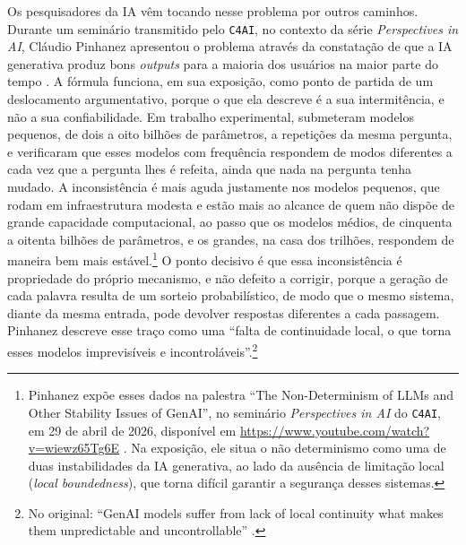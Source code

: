 Os pesquisadores da IA vêm tocando nesse problema por outros caminhos. Durante um seminário transmitido pelo \texttt{C4AI}, no contexto da série \textit{Perspectives in AI}, Cláudio Pinhanez apresentou o problema através da constatação de que a IA generativa produz bons \emph{outputs} para a maioria dos usuários na maior parte do tempo \parencite{Pinhanez2026Seminar}. A fórmula funciona, em sua exposição, como ponto de partida de um deslocamento argumentativo, porque o que ela descreve é a sua intermitência, e não a sua confiabilidade. Em trabalho experimental, \textcite{Pinhanez2025Small} submeteram modelos pequenos, de dois a oito bilhões de parâmetros, a repetições da mesma pergunta, e verificaram que esses modelos com frequência respondem de modos diferentes a cada vez que a pergunta lhes é refeita, ainda que nada na pergunta tenha mudado. A inconsistência é mais aguda justamente nos modelos pequenos, que rodam em infraestrutura modesta e estão mais ao alcance de quem não dispõe de grande capacidade computacional, ao passo que os modelos médios, de cinquenta a oitenta bilhões de parâmetros, e os grandes, na casa dos trilhões, respondem de maneira bem mais estável.\footnote{Pinhanez expõe esses dados na palestra \enquote{The Non-Determinism of LLMs and Other Stability Issues of GenAI}, no seminário \textit{Perspectives in AI} do \texttt{C4AI}, em 29 de abril de 2026, disponível em \url{https://www.youtube.com/watch?v=wiewz65Tg6E} \parencite{Pinhanez2026Seminar}. Na exposição, ele situa o não determinismo como uma de duas instabilidades da IA generativa, ao lado da ausência de limitação local (\textit{local boundedness}), que torna difícil garantir a segurança desses sistemas.} O ponto decisivo é que essa inconsistência é propriedade do próprio mecanismo, e não defeito a corrigir, porque a geração de cada palavra resulta de um sorteio probabilístico, de modo que o mesmo sistema, diante da mesma entrada, pode devolver respostas diferentes a cada passagem. Pinhanez descreve esse traço como uma \enquote{falta de continuidade local, o que torna esses modelos imprevisíveis e incontroláveis}.\footnote{No original: \enquote{GenAI models suffer from lack of local continuity what makes them unpredictable and uncontrollable} \parencite[tradução minha]{Pinhanez2026Seminar}.}

